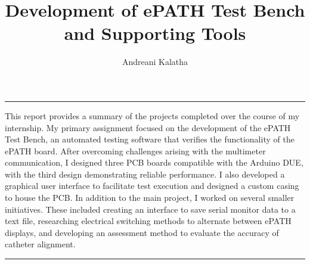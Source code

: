 \documentclass[10pt]{scrartcl}  %
\renewenvironment{abstract}
 {\quotation\large\noindent\rule{\linewidth}{.5pt}\par\smallskip
  {\centering\bfseries\abstractname\par}\medskip}
 {\par\noindent\rule{\linewidth}{.5pt}\endquotation}
\begin{document}
\renewcommand{\refname}{References}

\title{Development of ePATH Test Bench and Supporting Tools}
\author{Andreani Kalatha}
\maketitle

\begin{abstract}
This report provides a summary of the projects completed over the course of my internship. My primary assignment focused on the development of the ePATH Test Bench, an automated testing software that verifies the functionality of the ePATH board. After overcoming challenges arising with the multimeter communication, I designed three PCB boards compatible with the Arduino DUE, with the third design demonstrating reliable performance. I also developed a graphical user interface to facilitate test execution and designed a custom casing to house the PCB. In addition to the main project, I worked on several smaller initiatives. These included creating an interface to save serial monitor data to a text file, researching electrical switching methods to alternate between ePATH displays, and developing an assessment method to evaluate the accuracy of catheter alignment.
\end{abstract}

\newpage
\tableofcontents 
\newpage %

 



\printbibliography[heading=bibintoc]
\end{document}
